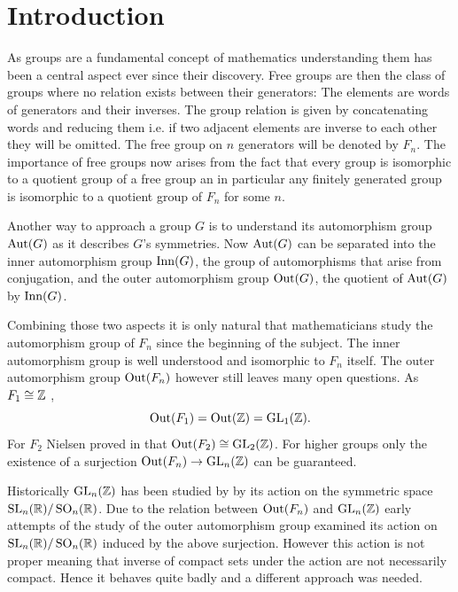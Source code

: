 %

\usepackage{todonotes}
\usepackage{./tikzit/tikzit}
\usepackage{biblatex}


\usepackage[stable]{footmisc}
\usepackage{caption}
\usepackage{subcaption}

	

\tableofcontents
\newpage
\section{Introduction}
As groups are a fundamental concept of mathematics understanding them has been a central aspect ever since their discovery.
Free groups are then the class of groups where no relation exists between their generators: 
The elements are words of generators and their inverses. The group relation is given by concatenating words
and reducing them i.e. if two adjacent elements are inverse to each other they will be omitted.
The free group on $n$ generators will be denoted by $F_{n}$.
The importance of free groups now arises from the fact that every group is isomorphic to a quotient group of a free group
an in particular any finitely generated group is isomorphic to a quotient group of $F_{n}$ for some $n$.

Another way to approach a group $G$ is to understand its automorphism group $\operatorname{Aut}(G)$ as it describes $G$'s symmetries.
Now $\operatorname{Aut}(G)$ can be separated into the inner automorphism group $\operatorname{Inn}(G)$,
the group of automorphisms that arise from conjugation, and the outer automorphism group $\operatorname{Out}(G)$, the quotient of  $\operatorname{Aut}(G)$ by $\operatorname{Inn}(G)$.

Combining those two aspects it is only natural that mathematicians study the automorphism group of $F_{n}$ since the beginning of the subject.
The inner automorphism group is well understood and isomorphic to $F_{n}$ itself.
The outer automorphism group $\operatorname{Out}(F_{n})$ however still leaves many open questions.
As $F_{1} \cong \mathbb{Z}$ ,
\[
	\operatorname{Out}(F_1) = \operatorname{Out}(\mathbb{Z}) = \operatorname{GL}_{1}(\mathbb{Z})
.\] 
For $F_{2}$ Nielsen proved in \cite{nielsen17} that $\operatorname{Out}(F_2) \cong \operatorname{GL}_{2}(\mathbb{Z})$.
For higher groups only the existence of a surjection $\operatorname{Out}(F_{n}) \to \operatorname{GL}_{n}(\mathbb{Z})$ can be guaranteed.

Historically $\operatorname{GL}_{n}(\mathbb{Z})$ has been studied by by its action on the symmetric space $\operatorname{SL}_{n}(\mathbb{R}) / \operatorname{SO}_{n}(\mathbb{R})$.
Due to the relation between $\operatorname{Out}(F_{n})$ and $\operatorname{GL}_{n}(\mathbb{Z})$ early attempts of the study of the outer automorphism group
examined its action on $\operatorname{SL}_{n}(\mathbb{R}) / \operatorname{SO}_{n}(\mathbb{R})$ induced by the above surjection.
However this action is not proper meaning that inverse of compact sets under the action are not necessarily compact.
Hence it behaves quite badly and a different approach was needed.

